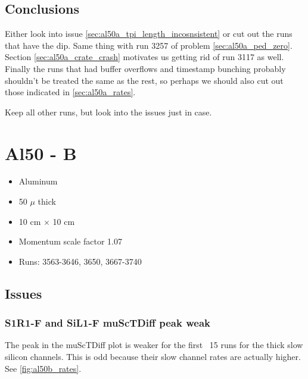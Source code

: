 \documentclass[a4paper]{article}
\begin{document}
\subsection{Conclusions}
Either look into issue \ref{sec:al50a_tpi_length_incosnsistent} or cut out the runs that have the dip. Same thing with run 3257 of
problem \ref{sec:al50a_ped_zero}. Section \ref{sec:al50a_crate_crash} motivates us getting rid of run 3117 as well. Finally
the runs that had buffer overflows and timestamp bunching probably shouldn't be treated the same as the rest, so perhaps
we should also cut out those indicated in \ref{sec:al50a_rates}.

Keep all other runs, but look into the issues just in case.



\section{Al50 - B}
\begin{itemize}
  \item Aluminum
  \item 50 $\mu$ thick
  \item 10 cm $\times$ 10 cm
  \item Momentum scale factor 1.07
  \item Runs:
    3563-3646, 3650, 3667-3740
\end{itemize}

\subsection{Issues}
\subsubsection{S1R1-F and SiL1-F muScTDiff peak weak}

The peak in the muScTDiff plot is weaker for the first ~15 runs for the thick slow silicon channels. This
is odd because their slow channel rates are actually higher. See \ref{fig:al50b_rates}.
\end{document}
